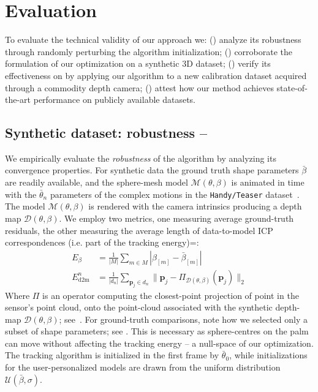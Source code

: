 \section{Evaluation}
To evaluate the technical validity of our approach we:
() analyze its robustness through randomly perturbing the algorithm initialization; 
() corroborate the formulation of our optimization on a synthetic 3D dataset;
() verify its effectiveness on by applying our algorithm to a new calibration dataset acquired through a commodity depth camera; 
() attest how our method achieves state-of-the-art performance on publicly available datasets.

\subsection{Synthetic dataset: robustness -- }
\label{sec:evalsynth}
We empirically evaluate the \emph{robustness} of the algorithm by analyzing its convergence properties. 
For synthetic data the ground truth shape parameters $\bar\beta$ are readily available, and the sphere-mesh model $\mathcal{M}(\theta,\beta)$ is animated in time with the $\bar\theta_n$ parameters of the complex motions in the \texttt{Handy/Teaser} dataset~\cite{tkach2016sphere}.
The model $\mathcal{M}(\theta,\beta)$ is rendered with the camera intrinsics producing a depth map $\mathcal{D}(\theta,\beta)$. We employ two metrics, one measuring average ground-truth residuals, the other measuring the average length of data-to-model ICP correspondences (i.e. part of the tracking energy)=:
% 
\begin{align}
E_{\beta} &= \tfrac{1}{|M|} \sum_{m \in M} \left| \beta_{[m]} - \bar\beta_{[m]} \right|
\\
E_\text{d2m}^n &= \tfrac{1}{|d_n|} \sum_{\mathbf{p}_j \in d_n} \| \mathbf{p}_j - \Pi_{\mathcal{D}(\theta,\beta)}(\mathbf{p}_j) \|_2
\label{eq:metrics}
\end{align}
% 
Where $\Pi$ is an operator computing the closest-point projection of point in the sensor's point cloud, onto the point-cloud associated with the synthetic depth-map $\mathcal{D}(\theta,\beta)$; see~\cite{tkach2016sphere}. For ground-truth comparisons, note how we selected only a subset  of shape parameters; see . This is necessary as sphere-centres on the palm can move without affecting the tracking energy -- a null-space of our optimization.
% 
The tracking algorithm is initialized in the first frame by $\bar\theta_0$, while initializations for the user-personalized models are drawn from the uniform distribution {\small $\mathcal{U}(\bar\beta, \sigma)$}.

